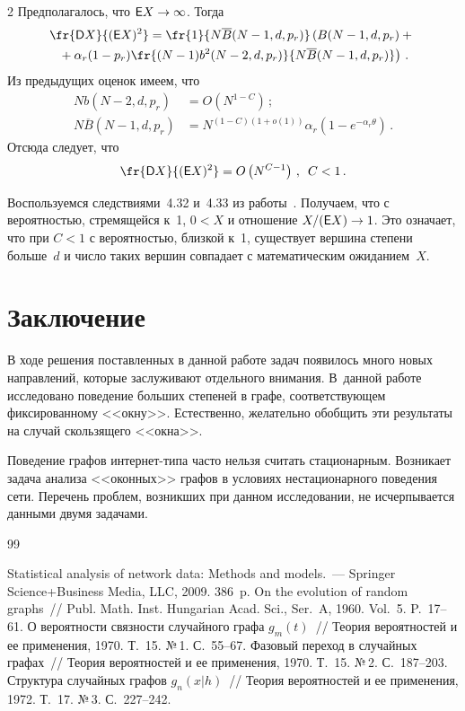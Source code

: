 \begin{multicols}{2}
     Предполагалось, что ${\sf E}X\rightarrow\infty$. Тогда
     \begin{multline*}
     \fr{{\sf D}X}{({\sf E}X)^2}=\fr{1}{N\overline{B}(N-1,d,p_r)}\left(
     B(N-1,d,p_r)+{}\right.\\
\left.     {}+\alpha_r(1-p_r)\fr{(N-1) b^2(N-2,d,p_r)}{N\overline{B}(N-1,d,p_r)}\right)\,.
     \end{multline*}
Из предыдущих оценок имеем, что 
\begin{align*}
Nb(N-2,d,p_r) &=O\left(N^{1-C}\right)\,;\\
N\overline{B} (N-1,d,p_r) &= N^{(1-C)(1+o(1))}\alpha_r\left( 1-e^{-\alpha_r\theta}\right)\,.
\end{align*}
Отсюда следует, что
$$
\fr{{\sf D}X}{({\sf E}X)^2} =O\left(N^{C-1}\right)\,,\enskip C<1\,.
$$
     
     Воспользуемся следствиями~4.32 и~4.33 из работы~\cite{15-gr}. Получаем, что с 
вероятностью, стремящейся к~1, $0<X$ и отношение $X/({\sf E}X)\rightarrow 1$. 
     Это означает, что при $C<1$ с вероятностью, близкой к~1, существует вершина степени 
больше~$d$ и число таких вершин совпадает с математическим ожиданием~$X$. 
     

\section{Заключение}
     
     В ходе решения поставленных в данной работе задач появилось много новых 
направлений, которые заслуживают отдельного внимания. В~данной работе исследовано 
поведение больших степеней в графе, соответствующем фиксированному <<окну>>. 
Естественно, желательно обобщить эти результаты на случай скользящего <<окна>>. 
     
     Поведение графов ин\-тер\-нет-ти\-па часто нельзя считать стационарным. Возникает 
задача анализа <<оконных>> графов в условиях нестационарного поведения сети. 
Перечень проблем, возникших при данном исследовании, не исчерпывается данными 
двумя задачами.

{\small\frenchspacing
{%
\begin{thebibliography}{99}
     
 Statistical analysis of network data: Methods and models.~--- Springer 
Science\;+\;Business Media, LLC, 2009. 386~p. 
 On the evolution of random 
graphs~// Publ. Math. Inst. Hungarian Acad. Sci., Ser.~A, 1960. Vol.~5. P.~17--61.
 О вероятности связности случайного графа $g_m(t)$~// Теория 
вероятностей и ее применения, 1970. Т.~15. №\,1. С.~55--67.
 Фазовый переход в случайных графах~// Теория вероятностей и ее 
применения, 1970. Т.~15. №\,2. С.~187--203.
 Структура случайных графов $g_n(x\vert h)$~// Теория вероятностей 
и ее применения, 1972. Т.~17. №\,3. С.~227--242.


\end{thebibliography}}}
\end{multicols}
